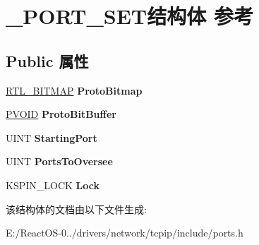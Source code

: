 \hypertarget{struct___p_o_r_t___s_e_t}{}\section{\+\_\+\+P\+O\+R\+T\+\_\+\+S\+E\+T结构体 参考}
\label{struct___p_o_r_t___s_e_t}
\subsection*{Public 属性}
\begin{DoxyCompactItemize}
\item 
\mbox{\label{struct___p_o_r_t___s_e_t_a12ab2e8db4cf070927858d29cbe232c6}} 
\hyperlink{struct___r_t_l___b_i_t_m_a_p}{R\+T\+L\+\_\+\+B\+I\+T\+M\+AP} {\bfseries Proto\+Bitmap}
\item 
\mbox{\label{struct___p_o_r_t___s_e_t_aa3106e012d6bce752786cc7ef72d2b24}} 
\hyperlink{interfacevoid}{P\+V\+O\+ID} {\bfseries Proto\+Bit\+Buffer}
\item 
\mbox{\label{struct___p_o_r_t___s_e_t_a0ddfc2ac2d9909877af6a5ce78a96cee}} 
U\+I\+NT {\bfseries Starting\+Port}
\item 
\mbox{\label{struct___p_o_r_t___s_e_t_a93b9877ce239cab9c43f2cc353584c89}} 
U\+I\+NT {\bfseries Ports\+To\+Oversee}
\item 
\mbox{\label{struct___p_o_r_t___s_e_t_af7a23654f30f8844a03f8e1b7aefe61c}} 
K\+S\+P\+I\+N\+\_\+\+L\+O\+CK {\bfseries Lock}
\end{DoxyCompactItemize}


该结构体的文档由以下文件生成\+:\begin{DoxyCompactItemize}
\item 
E\+:/\+React\+O\+S-\/0../drivers/network/tcpip/include/ports.\+h\end{DoxyCompactItemize}
